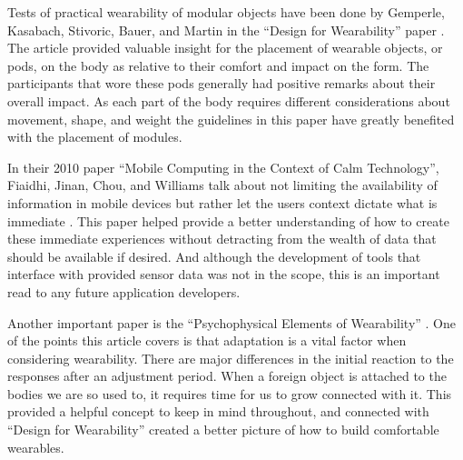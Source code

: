 
Tests of practical wearability of modular objects have been done by Gemperle, Kasabach, Stivoric, Bauer, and Martin in the ``Design for Wearability'' paper \citep{Gemperle98}. The article provided valuable insight for the placement of wearable objects, or pods, on the body as relative to their comfort and impact on the form. The participants that wore these pods generally had positive remarks about their overall impact. As each part of the body requires different considerations about movement, shape, and weight the guidelines in this paper have greatly benefited with the placement of modules.

In their 2010 paper ``Mobile Computing in the Context of Calm Technology'', Fiaidhi, Jinan, Chou, and Williams talk about not limiting the availability of information in mobile devices but rather let the users context dictate what is immediate \citep{Fiaidhi10}. This paper helped provide a better understanding of how to create these immediate experiences without detracting from the wealth of data that should be available if desired. And although the development of tools that interface with provided sensor data was not in the scope, this is an important read to any future application developers.

Another important paper is the ``Psychophysical Elements of Wearability'' \citep{Dunne07}. One of the points this article covers is that adaptation is a vital factor when considering wearability. There are major differences in the initial reaction to the responses after an adjustment period. When a foreign object is attached to the bodies we are so used to, it requires time for us to grow connected with it. This provided a helpful concept to keep in mind throughout, and connected with ``Design for Wearability'' \citep{Gemperle98} created a better picture of how to build comfortable wearables.
